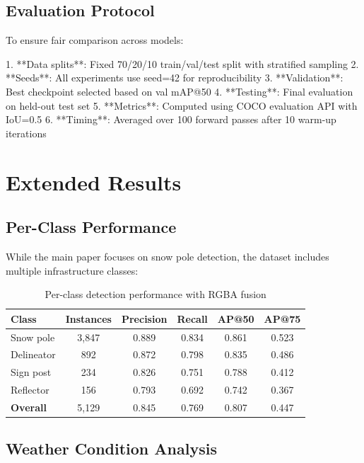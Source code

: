 \subsection{Evaluation Protocol}

To ensure fair comparison across models:

1. **Data splits**: Fixed 70/20/10 train/val/test split with stratified sampling
2. **Seeds**: All experiments use seed=42 for reproducibility  
3. **Validation**: Best checkpoint selected based on val mAP@50
4. **Testing**: Final evaluation on held-out test set
5. **Metrics**: Computed using COCO evaluation API with IoU=0.5
6. **Timing**: Averaged over 100 forward passes after 10 warm-up iterations

\section{Extended Results}

\subsection{Per-Class Performance}

While the main paper focuses on snow pole detection, the dataset includes multiple infrastructure classes:

\begin{table}[h]
\centering
\caption{Per-class detection performance with RGBA fusion}
\begin{tabular}{lccccc}
\toprule
\textbf{Class} & \textbf{Instances} & \textbf{Precision} & \textbf{Recall} & \textbf{AP@50} & \textbf{AP@75} \\
\midrule
Snow pole & 3,847 & 0.889 & 0.834 & 0.861 & 0.523 \\
Delineator & 892 & 0.872 & 0.798 & 0.835 & 0.486 \\
Sign post & 234 & 0.826 & 0.751 & 0.788 & 0.412 \\
Reflector & 156 & 0.793 & 0.692 & 0.742 & 0.367 \\
\midrule
\textbf{Overall} & 5,129 & 0.845 & 0.769 & 0.807 & 0.447 \\
\bottomrule
\end{tabular}
\end{table}

\subsection{Weather Condition Analysis}

